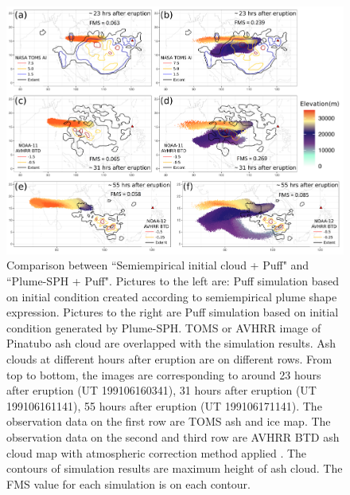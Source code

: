 \documentclass[utf8]{frontiersSCNS} %
\begin{document}
\begin{figure}[!htb]
\centering
\includegraphics[width=0.99 \textwidth]{Figures/bent_plume-maximum-height}
\caption{Comparison between ``Semiempirical initial cloud + Puff" and ``Plume-SPH + Puff". Pictures to the left are: Puff simulation based on initial condition created according to semiempirical plume shape expression. Pictures to the right are Puff simulation based on initial condition generated by Plume-SPH. TOMS or AVHRR image of Pinatubo ash cloud are overlapped with the simulation results. Ash clouds at different hours after eruption are on different rows. From top to bottom, the images are corresponding to around 23 hours after eruption (UT 199106160341), 31 hours after eruption (UT 199106161141), 55 hours after eruption (UT 199106171141). The observation data on the first row are TOMS ash and ice map. The observation data on the second and third row are AVHRR BTD ash cloud map with atmospheric correction method applied \citep{guo2004particles}. The contours of simulation results are maximum height of ash cloud. The FMS value for each simulation is on each contour.}
\label{fig:Plume-SPH-Puff-ash-cloud-max-height}
\end{figure}
\end{document}
